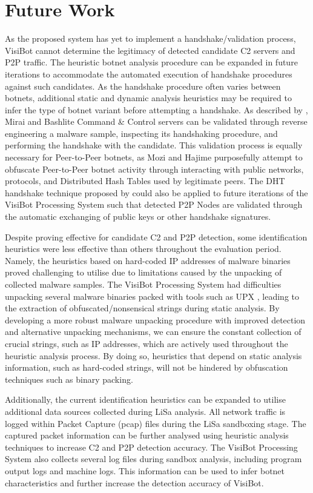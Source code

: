 \section{Future Work}

As the proposed system has yet to implement a handshake/validation process, VisiBot cannot determine the legitimacy of detected candidate C2 servers and P2P traffic. The heuristic botnet analysis procedure can be expanded in future iterations to accommodate the automated execution of handshake procedures against such candidates. As the handshake procedure often varies between botnets, additional static and dynamic analysis heuristics may be required to infer the type of botnet variant before attempting a handshake. As described by \citet{Bastos2019}, Mirai and Bashlite Command \& Control servers can be validated through reverse engineering a malware sample, inspecting its handshaking procedure, and performing the handshake with the candidate. This validation process is equally necessary for Peer-to-Peer botnets, as Mozi and Hajime purposefully attempt to obfuscate Peer-to-Peer botnet activity through interacting with public networks, protocols, and Distributed Hash Tables used by legitimate peers. \citep{Netlab2019} The DHT handshake technique proposed by \citet{Herwig2019} could also be applied to future iterations of the VisiBot Processing System such that detected P2P Nodes are validated through the automatic exchanging of public keys or other handshake signatures.

Despite proving effective for candidate C2 and P2P detection, some identification heuristics were less effective than others throughout the evaluation period. Namely, the heuristics based on hard-coded IP addresses of malware binaries proved challenging to utilise due to limitations caused by the unpacking of collected malware samples. The VisiBot Processing System had difficulties unpacking several malware binaries packed with tools such as UPX \citep{UPX}, leading to the extraction of obfuscated/nonsensical strings during static analysis. By developing a more robust malware unpacking procedure with improved detection and alternative unpacking mechanisms, we can ensure the constant collection of crucial strings, such as IP addresses, which are actively used throughout the heuristic analysis process. By doing so, heuristics that depend on static analysis information, such as hard-coded strings, will not be hindered by obfuscation techniques such as binary packing.

Additionally, the current identification heuristics can be expanded to utilise additional data sources collected during LiSa analysis. All network traffic is logged within Packet Capture (pcap) files during the LiSa sandboxing stage. The captured packet information can be further analysed using heuristic analysis techniques to increase C2 and P2P detection accuracy. The VisiBot Processing System also collects several log files during sandbox analysis, including program output logs and machine logs. This information can be used to infer botnet characteristics and further increase the detection accuracy of VisiBot. 

